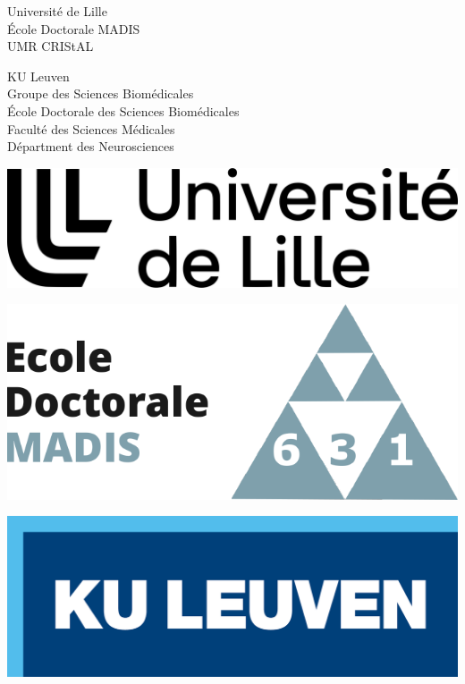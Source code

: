 {%
  \small
\parindent0pt
    \sffamily
    \begin{minipage}[t]{.5\textwidth}
    \vspace{0pt}
    Universit\'e de Lille \\
    \'Ecole Doctorale MADIS \\
    UMR CRIStAL
    \bigskip

    KU Leuven \\
    Groupe des Sciences Biom\'edicales \\
    \'Ecole Doctorale des Sciences Biom\'edicales \\
    Facult\'e des Sciences M\'edicales\\
    D\'epartment des Neurosciences

    \end{minipage}\hfill%
    \begin{minipage}[t]{.3\textwidth}
      \vspace{0pt}
      \includegraphics[width=\textwidth]{figures/ulille.png}
      \smallskip

      \includegraphics[width=\textwidth]{figures/edmadis.pdf}
      \smallskip


      \includegraphics[width=\textwidth]{figures/kul.png}
    \end{minipage}

}
